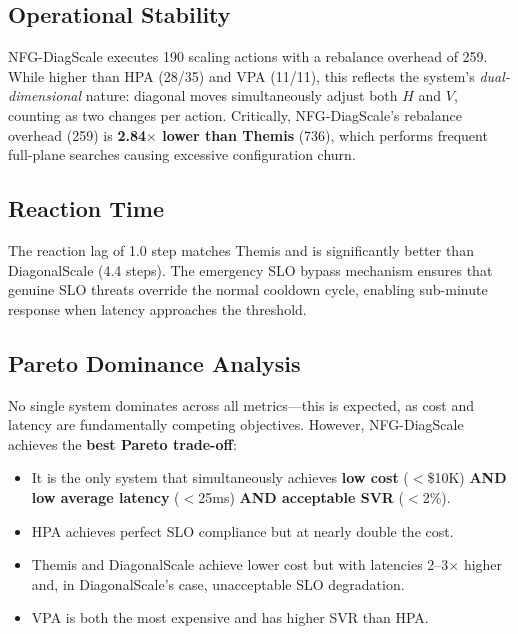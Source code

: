 \documentclass[conference]{IEEEtran}
\begin{document}
\subsection{Operational Stability}

NFG-DiagScale executes 190 scaling actions with a rebalance overhead of 259. While higher than HPA (28/35) and VPA (11/11), this reflects the system's \emph{dual-dimensional} nature: diagonal moves simultaneously adjust both $H$ and $V$, counting as two changes per action. Critically, NFG-DiagScale's rebalance overhead (259) is \textbf{2.84$\times$ lower than Themis} (736), which performs frequent full-plane searches causing excessive configuration churn.

\subsection{Reaction Time}

The reaction lag of 1.0 step matches Themis and is significantly better than DiagonalScale (4.4 steps). The emergency SLO bypass mechanism ensures that genuine SLO threats override the normal cooldown cycle, enabling sub-minute response when latency approaches the threshold.

\subsection{Pareto Dominance Analysis}

No single system dominates across all metrics---this is expected, as cost and latency are fundamentally competing objectives. However, NFG-DiagScale achieves the \textbf{best Pareto trade-off}:

\begin{itemize}
    \item It is the only system that simultaneously achieves \textbf{low cost} ($<$\$10K) \textbf{AND low average latency} ($<$25ms) \textbf{AND acceptable SVR} ($<$2\%).
    \item HPA achieves perfect SLO compliance but at nearly double the cost.
    \item Themis and DiagonalScale achieve lower cost but with latencies 2--3$\times$ higher and, in DiagonalScale's case, unacceptable SLO degradation.
    \item VPA is both the most expensive and has higher SVR than HPA.
\end{itemize}

\end{document}
